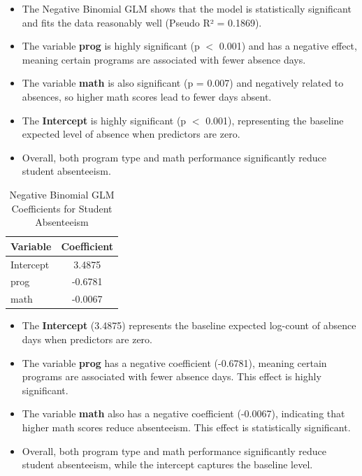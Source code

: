 \documentclass[12pt,a4paper]{report}
\begin{document}
\begin{tcolorbox}[colback=green!5!white,colframe=green!60!black,title=Interpretation]
\begin{itemize}
    \item The Negative Binomial GLM shows that the model is statistically significant and fits the data reasonably well (Pseudo R² = 0.1869).
    \item The variable \textbf{prog} is highly significant (p $<$ 0.001) and has a negative effect, meaning certain programs are associated with fewer absence days.
    \item The variable \textbf{math} is also significant (p = 0.007) and negatively related to absences, so higher math scores lead to fewer days absent.
    \item The \textbf{Intercept} is highly significant (p $<$ 0.001), representing the baseline expected level of absence when predictors are zero.
    \item Overall, both program type and math performance significantly reduce student absenteeism.
\end{itemize}
\end{tcolorbox}
\begin{table}[h!]
\centering
\begin{tabular}{|l|c|}
\hline
\textbf{Variable} & \textbf{Coefficient} \\ \hline
Intercept & 3.4875 \\ \hline
prog      & -0.6781 \\ \hline
math      & -0.0067 \\ \hline
\end{tabular}
\caption{Negative Binomial GLM Coefficients for Student Absenteeism}
\label{tab:nb_glm_coef}
\end{table}
\begin{tcolorbox}[colback=yellow!5!white,colframe=yellow!60!black,title=Interpretation]
\begin{itemize}
    \item The \textbf{Intercept} (3.4875) represents the baseline expected log-count of absence days when predictors are zero.
    \item The variable \textbf{prog} has a negative coefficient (-0.6781), meaning certain programs are associated with fewer absence days. This effect is highly significant.
    \item The variable \textbf{math} also has a negative coefficient (-0.0067), indicating that higher math scores reduce absenteeism. This effect is statistically significant.
    \item Overall, both program type and math performance significantly reduce student absenteeism, while the intercept captures the baseline level.
\end{itemize}
\end{tcolorbox}
\end{document}
